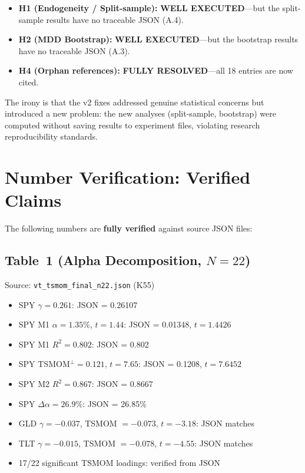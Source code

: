 \documentclass[12pt,a4paper]{article}
\begin{document}
\begin{itemize}
    \item \textbf{H1 (Endogeneity / Split-sample):} \textcolor{okgreen}{\textbf{WELL EXECUTED}}---but the split-sample results have no traceable JSON (A.4).
    \item \textbf{H2 (MDD Bootstrap):} \textcolor{okgreen}{\textbf{WELL EXECUTED}}---but the bootstrap results have no traceable JSON (A.3).
    \item \textbf{H4 (Orphan references):} \textcolor{okgreen}{\textbf{FULLY RESOLVED}}---all 18 entries are now cited.
\end{itemize}

The irony is that the v2 fixes addressed genuine statistical concerns but introduced a new problem: the new analyses (split-sample, bootstrap) were computed without saving results to experiment files, violating research reproducibility standards.


\section{Number Verification: Verified Claims}
\label{sec:verified}

The following numbers are \textbf{fully verified} against source JSON files:

\subsection{Table~1 (Alpha Decomposition, $N = 22$)}

Source: \texttt{vt\_tsmom\_final\_n22.json} (K55)

\begin{itemize}
    \item SPY $\gamma = 0.261$: JSON = 0.26107 \checkmark
    \item SPY M1 $\alpha = 1.35\%$, $t = 1.44$: JSON = 0.01348, $t = 1.4426$ \checkmark
    \item SPY M1 $R^2 = 0.802$: JSON = 0.802 \checkmark
    \item SPY TSMOM$^\perp = 0.121$, $t = 7.65$: JSON = 0.1208, $t = 7.6452$ \checkmark
    \item SPY M2 $R^2 = 0.867$: JSON = 0.8667 \checkmark
    \item SPY $\Delta\alpha = 26.9\%$: JSON = 26.85\% \checkmark
    \item GLD $\gamma = -0.037$, TSMOM $= -0.073$, $t = -3.18$: JSON matches \checkmark
    \item TLT $\gamma = -0.015$, TSMOM $= -0.078$, $t = -4.55$: JSON matches \checkmark
    \item 17/22 significant TSMOM loadings: verified from JSON \checkmark
\end{itemize}
\end{document}
